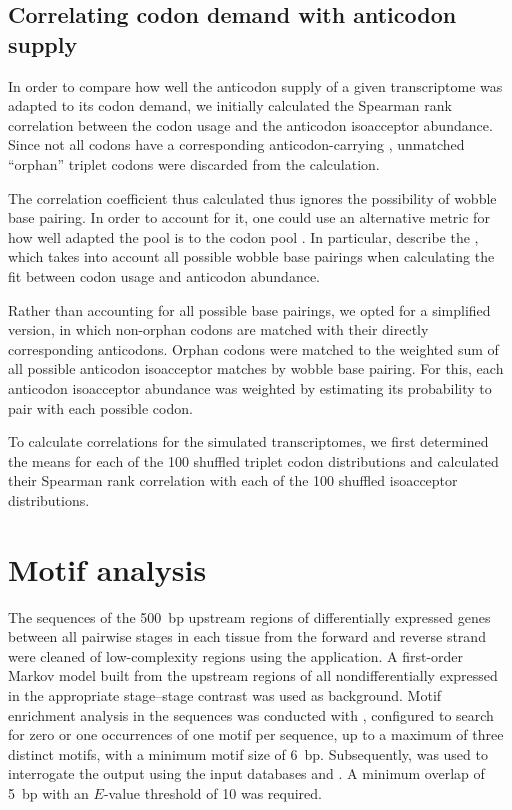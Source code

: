 \subsection{Correlating codon demand with anticodon supply}

In order to compare how well the anticodon supply of a given transcriptome was
adapted to its codon demand, we initially calculated the Spearman rank
correlation between the codon usage and the anticodon isoacceptor abundance.
Since not all codons have a corresponding anticodon-carrying \trna, unmatched
“orphan” triplet codons were discarded from the calculation.

The correlation coefficient thus calculated thus ignores the possibility of
wobble base pairing. In order to account for it, one could use an alternative
metric for how well adapted the \trna pool is to the codon pool
\citep{Gingold:2011}. In particular, \citet{Dos_Reis:2004} describe the \tai,
which takes into account all possible wobble base pairings when calculating the
fit between codon usage and anticodon abundance.

Rather than accounting for all possible base pairings, we opted for a simplified
version, in which non-orphan codons are matched with their directly
corresponding anticodons. Orphan codons were matched to the weighted sum of all
possible \trna anticodon isoacceptor matches by wobble base pairing. For this,
each anticodon isoacceptor abundance was weighted by estimating its probability
to pair with each possible codon.

To calculate correlations for the simulated transcriptomes, we first determined
the means for each of the \num{100} shuffled triplet codon distributions and
calculated their Spearman rank correlation with each of the \num{100} shuffled
isoacceptor distributions.

\section{Motif analysis}

The sequences of the \SI{500}{bp} upstream regions of differentially expressed
\trna genes between all pairwise stages in each tissue from the forward and
reverse strand were cleaned of low-complexity regions using the 
application. A first-order Markov model built from the upstream regions of
all nondifferentially expressed \trna[s] in the appropriate stage–stage contrast
was used as background. Motif enrichment analysis in the sequences was conducted
with  \citep{Bailey:2009}, configured to search for zero or one
occurrences of one motif per sequence, up to a maximum of three distinct motifs,
with a minimum motif size of \SI{6}{bp}. Subsequently, 
\citep{Gupta:2007} was used to interrogate the  output using the
input databases  and
. A minimum overlap of \SI{5}{bp} with an
\(E\)-value threshold of \num{10} was required.

